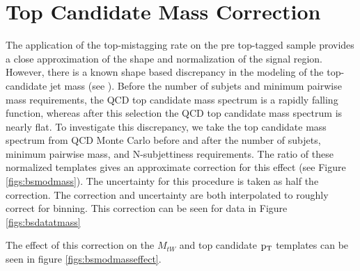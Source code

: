 \section{Top Candidate Mass Correction}
\label{sec:bsmodmass}
The application of the top-mistagging rate on the pre top-tagged sample provides a close approximation of the shape and normalization of the signal region.  
However, there is a known shape based discrepancy in the modeling of the top-candidate jet mass (see \cite{7tevZprime}). 
Before the number of subjets and minimum pairwise mass requirements, the QCD top candidate mass spectrum is a rapidly falling function, whereas after 
this selection the QCD top candidate mass spectrum is nearly flat.  To investigate this discrepancy, we take the top candidate mass 
spectrum from QCD Monte Carlo before and after the number of subjets, minimum pairwise mass, and N-subjettiness requirements.  
The ratio of these normalized templates gives an approximate correction for this effect (see Figure \ref{figs:bsmodmass}).  The uncertainty for this procedure is taken as half the correction.  
The correction and uncertainty are both interpolated to roughly correct for binning.  This correction can be seen for data in Figure \ref{figs:bsdatatmass}

The effect of this correction on the $M_{tW}$ and top candidate $\mathrm{p_{T}}$ templates can be seen in figure \ref{figs:bsmodmasseffect}.

